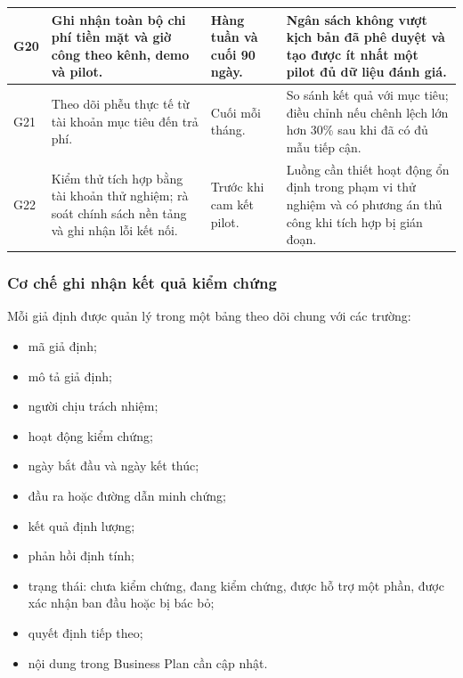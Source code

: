 \begin{longtable}{
    p{}
    p{}
    p{}
    p{}
}
    \hline

    G20
    &
    Ghi nhận toàn bộ chi phí tiền mặt và giờ công theo kênh, demo và pilot.
    &
    Hàng tuần và cuối 90 ngày.
    &
    Ngân sách không vượt kịch bản đã phê duyệt và tạo được ít nhất một pilot đủ dữ liệu đánh giá. \\

    \hline

    G21
    &
    Theo dõi phễu thực tế từ tài khoản mục tiêu đến trả phí.
    &
    Cuối mỗi tháng.
    &
    So sánh kết quả với mục tiêu; điều chỉnh nếu chênh lệch lớn hơn 30\% sau khi đã có đủ mẫu tiếp cận. \\

    \hline

    G22
    &
    Kiểm thử tích hợp bằng tài khoản thử nghiệm; rà soát chính sách nền tảng và ghi nhận lỗi kết nối.
    &
    Trước khi cam kết pilot.
    &
    Luồng cần thiết hoạt động ổn định trong phạm vi thử nghiệm và có phương án thủ công khi tích hợp bị gián đoạn. \\

    \hline
\end{longtable}

\subsubsection{Cơ chế ghi nhận kết quả kiểm chứng}

Mỗi giả định được quản lý trong một bảng theo dõi chung với các trường:

\begin{itemize}
    \item mã giả định;
    \item mô tả giả định;
    \item người chịu trách nhiệm;
    \item hoạt động kiểm chứng;
    \item ngày bắt đầu và ngày kết thúc;
    \item đầu ra hoặc đường dẫn minh chứng;
    \item kết quả định lượng;
    \item phản hồi định tính;
    \item trạng thái: chưa kiểm chứng, đang kiểm chứng, được hỗ trợ một phần, được xác nhận ban đầu hoặc bị bác bỏ;
    \item quyết định tiếp theo;
    \item nội dung trong Business Plan cần cập nhật.
\end{itemize}

